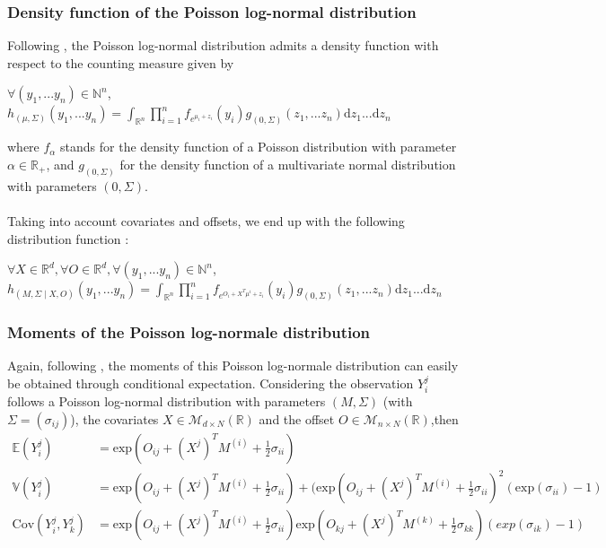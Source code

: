 \documentclass[11pt, a4paper]{article}
\begin{document}
\subsubsection{Density function of the Poisson log-normal distribution}
Following \cite{aitchison1989multivariate}, the Poisson log-normal distribution admits a density function with respect to the counting measure given by 
\begin{center}
$\forall (y_1,...y_n) \in \mathbb{N}^n$, $h_{(\mu,\Sigma)}(y_1,...y_n)=\int_{\mathbb{R}^n} \prod_{i=1}^n f_{e^{\mu_i+z_i}}(y_i) g_{(0,\Sigma)}(z_1,...z_n) \mathrm{d}z_1...\mathrm{d}z_n$
\end{center}
where $f_{\alpha}$ stands for the density function of a Poisson distribution with parameter $\alpha \in \mathbb{R}_+$, and $ g_{(0,\Sigma)}$ for the density function of a multivariate normal distribution with parameters $(0,\Sigma)$.\\
\\
Taking into account covariates and offsets, we end up with the following distribution function :
\begin{center}
$ \forall X \in \mathbb{R}^d, \forall O \in \mathbb{R}^d, \forall (y_1,...y_n) \in \mathbb{N}^n$, $h_{(M,\Sigma \mid X, O)}(y_1,...y_n)=\int_{\mathbb{R}^n} \prod_{i=1}^n f_{e^{O_i+X^T \mu^i+z_i}}(y_i) g_{(0,\Sigma)}(z_1,...z_n) \mathrm{d}z_1...\mathrm{d}z_n$
\end{center}
\subsubsection{Moments of the Poisson log-normale distribution} \label{Moments}
 Again, following \cite{aitchison1989multivariate}, the moments of this Poisson log-normale distribution can easily be obtained through conditional expectation. Considering the observation $Y^j_i$ follows a Poisson log-normal distribution with  parameters $(M , \Sigma)$ (with $\Sigma= (\sigma_{ij})$), the covariates $X \in \mathcal{M}_{d \times N} ( \mathbb{R})$ and the offset $O \in \mathcal{M}_{n \times N} (\mathbb{R})$,then 
\begin{align*}
\mathbb{E}(Y^j_i)& =\mathrm{exp}(O_{ij}+ (X^j)^T M^{(i)}+\frac{1}{2}\sigma_{ii})\\
\mathbb{V}(Y^j_i)& =\mathrm{exp}(O_{ij}+(X^j)^T M^{(i)}+\frac{1}{2}\sigma_{ii})+(\mathrm{exp}(O_{ij}+(X^j)^T M^{(i)}+\frac{1}{2}\sigma_{ii})^2(\mathrm{exp}(\sigma_{ii})-1)\\
\mathrm{Cov}(Y^j_i,Y^j_k)& =\mathrm{exp}(O_{ij}+(X^j)^T M^{(i)}+\frac{1}{2}\sigma_{ii})\mathrm{exp}(O_{kj}+(X^j)^T M^{(k)}+\frac{1}{2}\sigma_{kk})(exp(\sigma_{ik}) - 1)
\end{align*}
\end{document}
